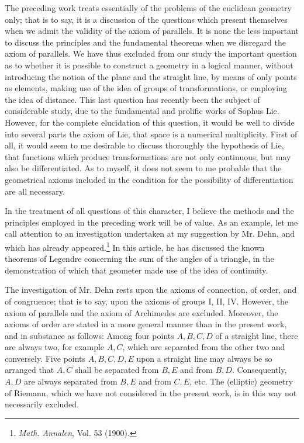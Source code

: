 \documentclass[11pt,oneside]{book}
\begin{document}
The preceding work treats essentially of the problems
of the euclidean geometry only; that is to
say, it is a discussion of the questions which present
themselves when we admit the validity of the axiom
of parallels. It is none the less important to discuss
the principles and the fundamental theorems when we
disregard the axiom of parallels. We have thus excluded
from our study the important question as to
whether it is possible to construct a geometry in a
logical manner, without introducing the notion of the
plane and the straight line, by means of only points
as elements, making use of the idea of groups of transformations,
or employing the idea of distance. This
last question has recently been the subject of considerable
study, due to the fundamental and prolific works
of Sophus Lie. However, for the complete elucidation
of this question, it would be well to divide into
several parts the axiom of Lie, that space is a numerical
multiplicity. First of all, it would seem to me
desirable to discuss thoroughly the hypothesis of Lie,
that functions which produce transformations are not
only continuous, but may also be differentiated. As
to myself, it does not seem to me probable that the
geometrical axioms included in the condition for the
possibility of differentiation are all necessary.

In the treatment of all questions of this character,
I believe the methods and the principles employed in
the preceding work will be of value. As an example,
let me call attention to an investigation undertaken at
my suggestion by Mr. Dehn, and which has already
appeared.\footnote{\textit{Math. Annalen}, Vol. 53 (1900).}
In this article, he has discussed the known
theorems of Legendre concerning the sum of the angles
of a triangle, in the demonstration of which that
geometer made use of the idea of continuity.

The investigation of Mr. Dehn rests upon the axioms
of connection, of order, and of congruence; that
is to say, upon the axioms of groups I, II, IV\@.  However,
the axiom of parallels and the axiom of Archimedes
are excluded.  Moreover, the axioms of order
are stated in a more general manner than in the present
work, and in substance as follows: Among four
points $A, B, C, D$ of a straight line, there are always
two, for example $A, C$, which are separated from the
other two and conversely.  Five points $A, B, C, D,
E$ upon a straight line may always be so arranged that
$A, C$ shall be separated from $B, E$ and from $B, D$.
Consequently, $A, D$ are always separated from $B, E$
and from $C, E$, etc.  The (elliptic) geometry of Riemann,
which we have not considered in the present
work, is in this way not necessarily excluded.
\end{document}
